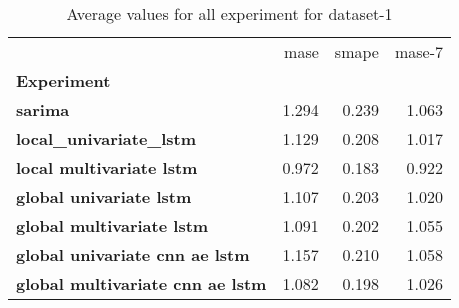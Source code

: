 \begin{table}[h]
\centering
\caption{Average values for all experiment for dataset-1}
\label{table:Average-metric-dataset-1}
\begin{tabular}{lrrr}
\toprule
{} &   mase &  smape &  mase-7 \\
\textbf{Experiment                     } &        &        &         \\
\midrule
\textbf{sarima                         } &  1.294 &  0.239 &   1.063 \\
\textbf{local\_univariate\_lstm          } &  1.129 &  0.208 &   1.017 \\
\textbf{local multivariate lstm        } &  0.972 &  0.183 &   0.922 \\
\textbf{global univariate lstm         } &  1.107 &  0.203 &   1.020 \\
\textbf{global multivariate lstm       } &  1.091 &  0.202 &   1.055 \\
\textbf{global univariate cnn ae lstm  } &  1.157 &  0.210 &   1.058 \\
\textbf{global multivariate cnn ae lstm} &  1.082 &  0.198 &   1.026 \\
\bottomrule
\end{tabular}
\end{table}
